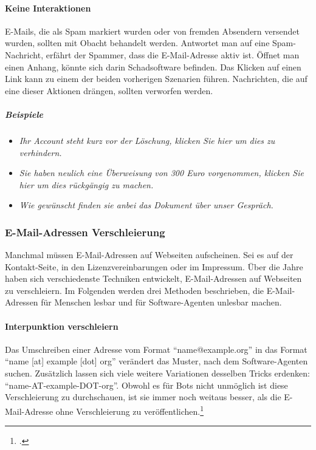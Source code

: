 \paragraph{Keine Interaktionen}
\label{par:keine-interaktionen}

E-Mails, die als Spam markiert wurden oder von fremden Absendern versendet
wurden, sollten mit Obacht behandelt werden. Antwortet man auf eine
Spam-Nachricht, erfährt der Spammer, dass die E-Mail-Adresse aktiv ist. Öffnet
man einen Anhang, könnte sich darin Schadsoftware befinden. Das Klicken auf
einen Link kann zu einem der beiden vorherigen Szenarien führen. Nachrichten,
die auf eine dieser Aktionen drängen, sollten verworfen werden.

\subparagraph{Beispiele}
\label{spar:beispiele}

\begin{itemize}
\item
  \emph{Ihr Account steht kurz vor der Löschung, klicken Sie hier um dies zu
  verhindern.}
\item
  \emph{Sie haben neulich eine Überweisung von 300 Euro vorgenommen, klicken
  Sie hier um dies rückgängig zu machen.}
\item
  \emph{Wie gewünscht finden sie anbei das Dokument über unser Gespräch.}
\end{itemize}

\subsubsection{E-Mail-Adressen Verschleierung}
\label{ssub:e-mail-adressen-verschleierung}

Manchmal müssen E-Mail-Adressen auf Webseiten aufscheinen. Sei es auf der
Kontakt-Seite, in den Lizenzvereinbarungen oder im Impressum. Über die Jahre
haben sich verschiedenste Techniken entwickelt, E-Mail-Adressen auf Webseiten
zu verschleiern. Im Folgenden werden drei Methoden beschrieben, die
E-Mail-Adressen für Menschen lesbar und für Software-Agenten unlesbar machen.

\paragraph{Interpunktion verschleiern}
\label{par:interpunktion-verschleiern}

Das Umschreiben einer Adresse vom Format \enquote{name@example.org} in das
Format \enquote{name {[}at{]} example {[}dot{]} org} verändert das Muster, nach
dem Software-Agenten suchen. Zusätzlich lassen sich viele weitere Variationen
desselben Tricks erdenken: \enquote{name-AT-example-DOT-org}. Obwohl es für
Bots nicht unmöglich ist diese Verschleierung zu durchschauen, ist sie immer
noch weitaus besser, als die E-Mail-Adresse ohne Verschleierung zu
veröffentlichen.\footcite{obfuscateEmailAddresses}

